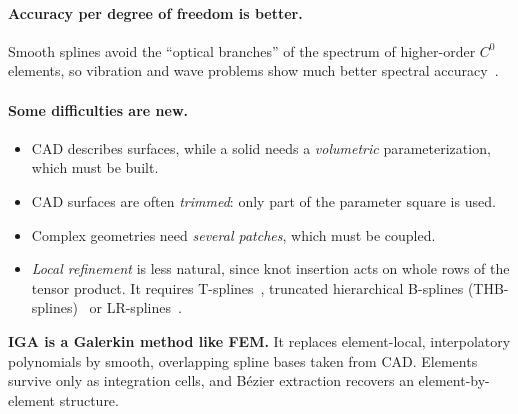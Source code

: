 \paragraph{Accuracy per degree of freedom is better.}
%
Smooth splines avoid the ``optical branches'' of the spectrum of higher-order
$C^0$ elements, so vibration and wave problems show much better spectral
accuracy~\cite{CottrellVibrations2006}.

\paragraph{Some difficulties are new.}
%
\begin{itemize}
\item CAD describes surfaces, while a solid needs a \emph{volumetric}
parameterization, which must be built.
\item CAD surfaces are often \emph{trimmed}: only part of the parameter
square is used.
\item Complex geometries need \emph{several patches}, which must be coupled.
\item \emph{Local refinement} is less natural, since knot insertion acts on
whole rows of the tensor product. It requires T-splines~\cite{SederbergTsplines2003},
truncated hierarchical B-splines (THB-splines)~\cite{GiannelliTHB2012} or
LR-splines~\cite{DokkenLR2013}.
\end{itemize}

\begin{gbox*}
\textbf{IGA is a Galerkin method like FEM.} It replaces element-local,
interpolatory polynomials by smooth, overlapping spline bases taken from
CAD. Elements survive only as integration cells, and B\'ezier extraction
recovers an element-by-element structure.
\end{gbox*}

